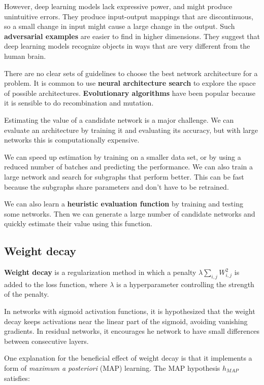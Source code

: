 \documentclass{article}
\begin{document}
However, deep learning models lack expressive power, and might produce unintuitive
errors. They produce input-output mappings that are discontinuous, so a small change
in input might cause a large change in the output. Such \textbf{adversarial examples}
are easier to find in higher dimensions. They suggest that deep learning models 
recognize objects in ways that are very different from the human brain.

There are no clear sets of guidelines to choose the best network architecture for a 
problem. It is common to use \textbf{neural architecture search} to explore the space
of possible architectures. \textbf{Evolutionary algorithms} have been popular because
it is sensible to do recombination and mutation.

Estimating the value of a candidate network is a major challenge. We can evaluate
an architecture by training it and evaluating its accuracy, but with large networks
this is computationally expensive. 

We can speed up estimation by training on a smaller data set, or by using a reduced
number of batches and predicting the performance. We can also train a large network
and search for subgraphs that perform better. This can be fast because the subgraphs
share parameters and don't have to be retrained.

We can also learn a \textbf{heuristic evaluation function} by training and testing
some networks. Then we can generate a large number of candidate networks and quickly
estimate their value using this function.

\subsection{Weight decay}

\textbf{Weight decay} is a regularization method in which a penalty
$\lambda \sum_{i,j} W_{i,j}^2$ is added to the loss function, where $\lambda$ is a
hyperparameter controlling the strength of the penalty.

In networks with sigmoid activation functions, it is hypothesized that the weight
decay keeps activations near the linear part of the sigmoid, avoiding vanishing
gradients. In residual networks, it encourages he network to have small differences
between consecutive layers. 

One explanation for the beneficial effect of weight decay is that it implements a
form of \textit{maximum a posteriori} (MAP) learning. The MAP hypothesis $h_{MAP}$
satisfies:
\end{document}
